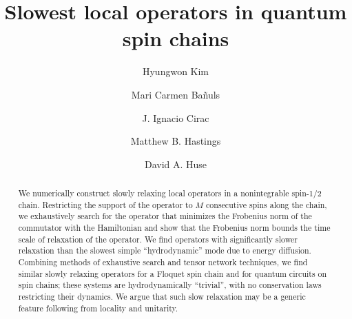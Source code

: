 \documentclass[twocolumn,superscriptaddress, prb]{revtex4-1}
\begin{document}
\title{Slowest local operators in quantum spin chains}

\author{Hyungwon Kim}

\author{Mari Carmen Ba\~{n}uls}

\author{J. Ignacio Cirac}

\author{Matthew B. Hastings}

\author{David A. Huse}

\begin{abstract}
We numerically construct slowly relaxing local operators in a nonintegrable spin-1/2 chain.
Restricting the support of the operator to $M$ consecutive spins along the chain,
we exhaustively search for the operator that minimizes the Frobenius norm of the commutator
with the Hamiltonian and show that the Frobenius norm bounds the time scale of relaxation of the operator.
We find %
operators with significantly slower relaxation than
the slowest simple ``hydrodynamic'' mode due to energy diffusion.
Combining methods of exhaustive search and tensor network techniques, we find
similar slowly relaxing operators for a Floquet spin chain and for quantum circuits on spin chains;
these systems are hydrodynamically ``trivial'', with no conservation laws restricting their dynamics.
We argue that such slow relaxation may be a generic feature following from locality and unitarity.
\end{abstract}

\pacs{}

\maketitle
\end{document}
